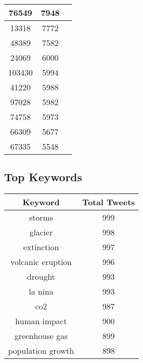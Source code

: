 \documentclass{article}\usepackage[T1]{fontenc}
\begin{document}
\begin{tabular}{|c|c|c|}
 \hline
76549 & 7948\\ 
 \hline
13318 & 7772\\ 
 \hline
48389 & 7582\\ 
 \hline
24069 & 6000\\ 
 \hline
103430 & 5994\\ 
 \hline
41220 & 5988\\ 
 \hline
97028 & 5982\\ 
 \hline
74758 & 5973\\ 
 \hline
66309 & 5677\\ 
 \hline
67335 & 5548\\ 
 \hline
\end{tabular}\subsection*{Top Keywords}\begin{tabular}{|c|c|}         \hline         Keyword & Total Tweets \\ 
 \hline
storms & 999\\ 
 \hline
glacier & 998\\ 
 \hline
extinction & 997\\ 
 \hline
volcanic eruption & 996\\ 
 \hline
drought & 993\\ 
 \hline
la nina & 993\\ 
 \hline
co2 & 987\\ 
 \hline
human impact & 900\\ 
 \hline
greenhouse gas & 899\\ 
 \hline
population growth & 898\\ 
 \hline
\end{tabular}
\end{document}
